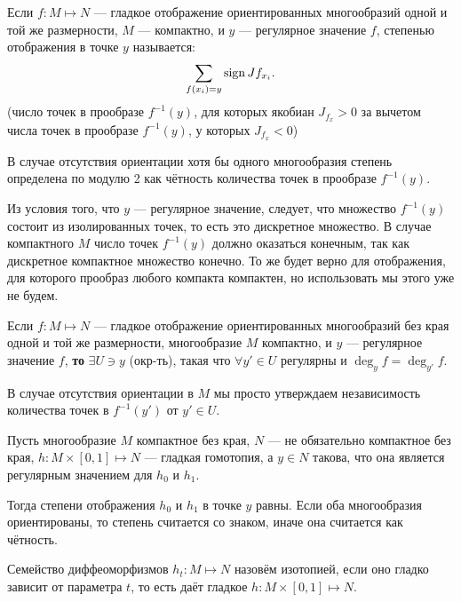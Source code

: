 \begin{to_def}
	Если $f \colon M \mapsto N$ --- гладкое отображение ориентированных многообразий одной и той же размерности, $M$ --- компактно, и $y$ --- регулярное значение $f$, степенью отображения в точке $y$ называется: 
	\begin{equation*}
		\sum_{f(x_i) = y} \mathop{\mathrm{sign}}\nolimits J f_{x_i}.
	\end{equation*}
	(число точек в прообразе $f^{-1}(y)$, для которых якобиан $J_{f_x}>0$ за вычетом числа точек в прообразе $f^{-1}(y)$, у которых $J_{f_x}<0$)

	В случае отсутствия ориентации хотя бы одного многообразия степень определена по модулю 2 как чётность количества точек в прообразе $f^{-1}(y)$.
\end{to_def}

Из условия того, что $y$ --- регулярное значение, следует, что множество $f^{-1}(y)$ состоит из изолированных точек, то есть это дискретное множество. В случае компактного $M$ число точек $f^{-1}(y)$ должно оказаться конечным, так как дискретное компактное множество конечно. То же будет верно для отображения, для которого прообраз любого компакта компактен, но использовать мы этого уже не будем.

\begin{to_lem}
	Если $f\colon M \mapsto N$ --- гладкое отображение ориентированных многообразий без края одной и той же размерности, многообразие $M$ компактно, и $y$ --- регулярное значение $f$, \textbf{то} $\exists U \ni y$ (окр-ть), такая что $\forall y' \in U$ регулярны и $\deg_y f = \deg_{y'} f$. 

	В случае отсутствия ориентации в $M$ мы просто утверждаем независимость количества точек в $f^{-1} (y')$ от $y'\in U$.
\end{to_lem}

\begin{to_thr}
	Пусть многообразие $M$ компактное без края, $N$ --- не обязательно компактное без края, $h \colon M \times [0,1] \mapsto N$ --- гладкая гомотопия, а $y \in N$ такова, что она является регулярным значением для $h_{0}$ и $h_{1}$. 

	Тогда степени отображения $h_0$ и $h_1$ в точке $y$ равны. Если оба многообразия ориентированы, то степень считается со знаком, иначе она считается как чётность.
\end{to_thr}

\begin{to_def}
	Семейство диффеоморфизмов $h_t \colon M \mapsto N$ назовём изотопией, если оно гладко зависит от параметра $t$, то есть даёт гладкое $h \colon M \times [0,1] \mapsto N$.
\end{to_def}

